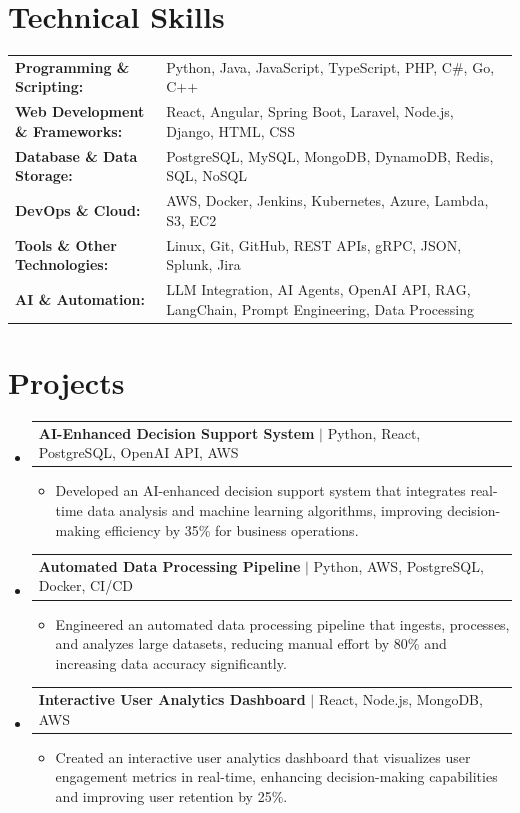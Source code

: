 \documentclass[letterpaper,10pt]{article}
\makeatletter
\newcommand{\resumeItem}[1]{
  \item{\fontsize{8pt}{9pt}\selectfont
    #1 \vspace{-3pt}
  }
}
\newcommand{\resumeProjectHeading}[2]{
    \item
    \begin{tabular*}{1.001\textwidth}{l@{\extracolsep{\fill}}r}
      \fontsize{8.5pt}{10pt}#1 & \textbf{\fontsize{8.5pt}{10pt} #2}\\
    \end{tabular*}\vspace{-7pt}
}
\newcommand{\resumeSubHeadingListStart}{\begin{itemize}[leftmargin=0pt, label={}]}
\newcommand{\resumeSubHeadingListEnd}{\end{itemize}}
\newcommand{\resumeItemListStart}{\begin{itemize}[leftmargin=*]}
\newcommand{\resumeItemListEnd}{\end{itemize}\vspace{-5pt}}
\makeatother
\begin{document}
\section{Technical Skills}
        \vspace{-14pt}
        \begin{table}[h]
            \fontsize{8pt}{9pt}\selectfont
            \begin{tabular}{p{0.3\linewidth} p{0.7\linewidth}}
                \textbf{Programming \& Scripting:} & Python, Java, JavaScript, TypeScript, PHP, C\#, Go, C++ \\
                \textbf{Web Development \& Frameworks:} & React, Angular, Spring Boot, Laravel, Node.js, Django, HTML, CSS \\
                \textbf{Database \& Data Storage:} & PostgreSQL, MySQL, MongoDB, DynamoDB, Redis, SQL, NoSQL \\
                \textbf{DevOps \& Cloud:} & AWS, Docker, Jenkins, Kubernetes, Azure, Lambda, S3, EC2 \\
                \textbf{Tools \& Other Technologies:} & Linux, Git, GitHub, REST APIs, gRPC, JSON, Splunk, Jira \\
                \textbf{AI \& Automation:} & LLM Integration, AI Agents, OpenAI API, RAG, LangChain, Prompt Engineering, Data Processing \\
            \end{tabular}
        \end{table}
 \vspace{-18pt}

\section{Projects}
    \vspace{-5pt}
    \resumeSubHeadingListStart
          \resumeProjectHeading
            {\textbf{AI-Enhanced Decision Support System} $|$ Python, React, PostgreSQL, OpenAI API, AWS}{}
            \resumeItemListStart
                \resumeItem{Developed an AI-enhanced decision support system that integrates real-time data analysis and machine learning algorithms, improving decision-making efficiency by 35\% for business operations.}
            \resumeItemListEnd
        \vspace{-12pt}
    
        \resumeProjectHeading
            {\textbf{Automated Data Processing Pipeline} $|$ Python, AWS, PostgreSQL, Docker, CI/CD}{}
        \resumeItemListStart
                \resumeItem{Engineered an automated data processing pipeline that ingests, processes, and analyzes large datasets, reducing manual effort by 80\% and increasing data accuracy significantly.}
        \resumeItemListEnd
      \vspace{-12pt}
      \resumeProjectHeading
        {\textbf{Interactive User Analytics Dashboard} $|$ React, Node.js, MongoDB, AWS}{}
    \resumeItemListStart
            \resumeItem{Created an interactive user analytics dashboard that visualizes user engagement metrics in real-time, enhancing decision-making capabilities and improving user retention by 25\%.}
    \resumeItemListEnd
    \resumeSubHeadingListEnd
\end{document}
